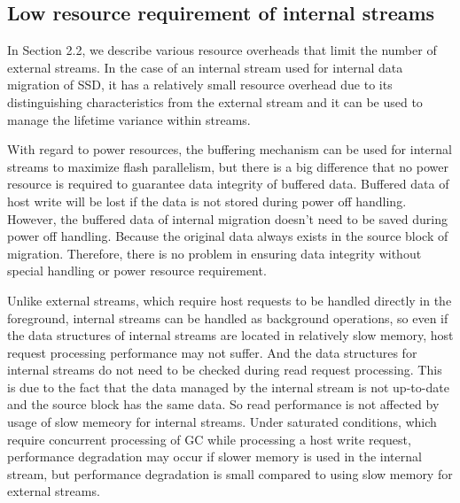 \subsection{Low resource requirement of internal streams}

In Section 2.2, we describe various resource overheads that limit the number of external streams.
In the case of an internal stream used for internal data migration of SSD, 
it has a relatively small resource overhead due to its distinguishing characteristics from the external stream
and it can be used to manage the lifetime variance within streams.

{\color{blue}
With regard to power resources, the buffering mechanism can be used for internal streams to maximize flash parallelism, but there is a big difference that no power resource is required to guarantee data integrity of buffered data.
Buffered data of host write will be lost if the data is not stored during power off handling.
However, the buffered data of internal migration doesn't need to be saved during power off handling. Because the original data always exists in the source block of migration. 
Therefore, there is no problem in ensuring data integrity without special handling or power resource requirement.

Unlike external streams, which require host requests to be handled directly in the foreground,
internal streams can be handled as background operations, 
so even if the data structures of internal streams are located in relatively slow memory, 
host request processing performance may not suffer. 
And the data structures for internal streams do not need to be checked during 
read request processing.
This is due to the fact that the data managed by the internal stream is not up-to-date 
and the source block has the same data. 
So read performance is not affected by usage of slow memeory for internal streams.
Under saturated conditions, which require concurrent processing of GC while processing a host write request, 
performance degradation may occur if slower memory is used in the internal stream, but performance degradation is small compared to using slow memory for external streams.
}

